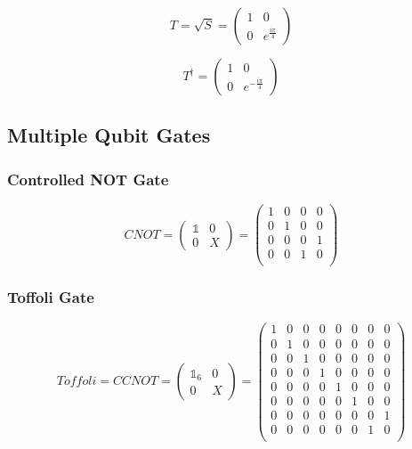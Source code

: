 \begin{equation}
T = \sqrt{S} = \begin{pmatrix}
 1 & 0 \\ 
 0 & e^{\frac{i\pi}{4}}
 \end{pmatrix}
\end{equation}

\begin{equation}
T^\dagger = \begin{pmatrix}
 1 & 0 \\ 
 0 & e^{-\frac{i\pi}{4}}
 \end{pmatrix}
\end{equation}




\subsection{Multiple Qubit Gates}
\label{subsubsec:multiqubitgates}

\subsubsection{Controlled NOT Gate}
\label{subsubsubsec:cnotgate}

\begin{equation}
CNOT = \begin{pmatrix}
 \mathbb{1} & 0 \\ 
 0 & X
 \end{pmatrix} = \begin{pmatrix}
 1 & 0 & 0 & 0 \\ 
 0 & 1 & 0 & 0 \\
 0 & 0 & 0 & 1 \\
 0 & 0 & 1 & 0 \\
 \end{pmatrix}
\end{equation}

\subsubsection{Toffoli Gate}
\label{subsubsubsec:toffoligate}

\begin{equation}
Toffoli = CCNOT = \begin{pmatrix}
 \mathbb{1}_6 & 0 \\ 
 0 & X
 \end{pmatrix} = \begin{pmatrix}
 1 & 0 & 0 & 0 & 0 & 0 & 0 & 0 \\ 
 0 & 1 & 0 & 0 & 0 & 0 & 0 & 0 \\ 
 0 & 0 & 1 & 0 & 0 & 0 & 0 & 0 \\ 
 0 & 0 & 0 & 1 & 0 & 0 & 0 & 0 \\ 
 0 & 0 & 0 & 0 & 1 & 0 & 0 & 0 \\ 
 0 & 0 & 0 & 0 & 0 & 1 & 0 & 0 \\
 0 & 0 & 0 & 0 & 0 & 0 & 0 & 1 \\ 
 0 & 0 & 0 & 0 & 0 & 0 & 1 & 0 \\ 
 \end{pmatrix}
\end{equation}

